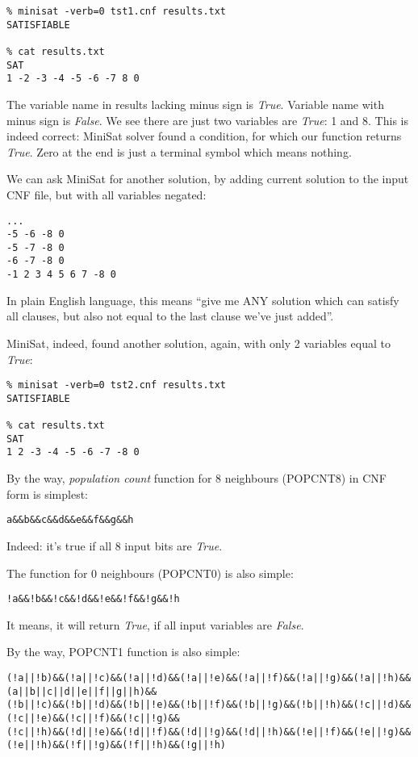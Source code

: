 \begin{lstlisting}
% minisat -verb=0 tst1.cnf results.txt
SATISFIABLE

% cat results.txt
SAT
1 -2 -3 -4 -5 -6 -7 8 0
\end{lstlisting}

The variable name in results lacking minus sign is \emph{True}.
Variable name with minus sign is \emph{False}.
We see there are just two variables are \emph{True}: 1 and 8.
This is indeed correct: MiniSat solver found a condition, for which our function returns \emph{True}.
Zero at the end is just a terminal symbol which means nothing.

We can ask MiniSat for another solution, by adding current solution to the input CNF file, but with all variables negated:

\begin{lstlisting}
...
-5 -6 -8 0
-5 -7 -8 0
-6 -7 -8 0
-1 2 3 4 5 6 7 -8 0
\end{lstlisting}

In plain English language, this means ``give me ANY solution which can satisfy all clauses, but also not equal to the last clause we've just added''.

MiniSat, indeed, found another solution, again, with only 2 variables equal to \emph{True}:

\begin{lstlisting}
% minisat -verb=0 tst2.cnf results.txt
SATISFIABLE

% cat results.txt
SAT
1 2 -3 -4 -5 -6 -7 -8 0
\end{lstlisting}

By the way, \emph{population count} function for 8 neighbours (POPCNT8) in CNF form is simplest:

\begin{lstlisting}
a&&b&&c&&d&&e&&f&&g&&h
\end{lstlisting}

Indeed: it's true if all 8 input bits are \emph{True}.

The function for 0 neighbours (POPCNT0) is also simple:

\begin{lstlisting}
!a&&!b&&!c&&!d&&!e&&!f&&!g&&!h
\end{lstlisting}

It means, it will return \emph{True}, if all input variables are \emph{False}.

By the way, POPCNT1 function is also simple:

\begin{lstlisting}
(!a||!b)&&(!a||!c)&&(!a||!d)&&(!a||!e)&&(!a||!f)&&(!a||!g)&&(!a||!h)&&(a||b||c||d||e||f||g||h)&&
(!b||!c)&&(!b||!d)&&(!b||!e)&&(!b||!f)&&(!b||!g)&&(!b||!h)&&(!c||!d)&&(!c||!e)&&(!c||!f)&&(!c||!g)&&
(!c||!h)&&(!d||!e)&&(!d||!f)&&(!d||!g)&&(!d||!h)&&(!e||!f)&&(!e||!g)&&(!e||!h)&&(!f||!g)&&(!f||!h)&&(!g||!h)
\end{lstlisting}

